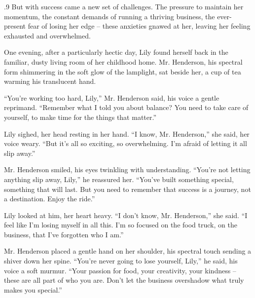 \documentclass{article}
\newcommand{\Agentsroomzs}{\textsc{Agents' Room$_{ZS}$}}
\begin{document}
\begin{tcolorbox}[colback=white, colframe=gray!30!white, coltitle=black, parskip=5mm, title=
    \textbf{System output: \Agentsroomzs}, breakable]
\begin{spacing}{.9}
But with success came a new set of challenges.  The pressure to maintain her momentum, the constant demands of running a thriving business, the ever-present fear of losing her edge – these anxieties gnawed at her, leaving her feeling exhausted and overwhelmed.\\\par

One evening, after a particularly hectic day, Lily found herself back in the familiar, dusty living room of her childhood home.  Mr. Henderson, his spectral form shimmering in the soft glow of the lamplight, sat beside her, a cup of tea warming his translucent hand.\\\par

“You’re working too hard, Lily,” Mr. Henderson said, his voice a gentle reprimand.  “Remember what I told you about balance?  You need to take care of yourself, to make time for the things that matter.”\\\par

Lily sighed, her head resting in her hand.  “I know, Mr. Henderson,” she said, her voice weary.  “But it’s all so exciting, so overwhelming.  I’m afraid of letting it all slip away.”\\\par

Mr. Henderson smiled, his eyes twinkling with understanding.  “You’re not letting anything slip away, Lily,” he reassured her.  “You’ve built something special, something that will last.  But you need to remember that success is a journey, not a destination.  Enjoy the ride.”\\\par

Lily looked at him, her heart heavy.  “I don’t know, Mr. Henderson,” she said.  “I feel like I’m losing myself in all this.  I’m so focused on the food truck, on the business, that I’ve forgotten who I am.”\\\par

Mr. Henderson placed a gentle hand on her shoulder, his spectral touch sending a shiver down her spine.  “You’re never going to lose yourself, Lily,” he said, his voice a soft murmur.  “Your passion for food, your creativity, your kindness – these are all part of who you are.  Don’t let the business overshadow what truly makes you special.”\\\par


\end{spacing}
\end{tcolorbox}
\end{document}
